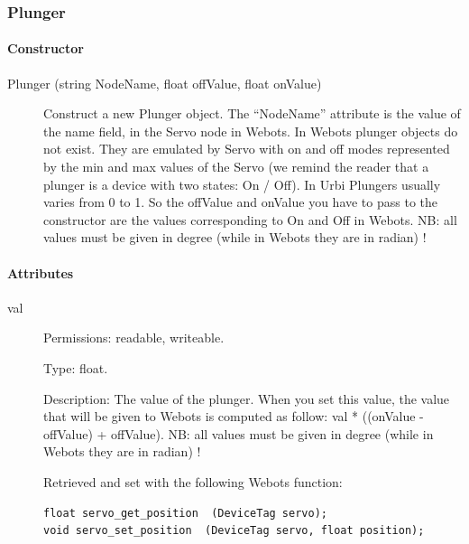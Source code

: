 \subsubsection{Plunger}
\label{webots.uobjects.robotdevices.plunger}%

\paragraph{Constructor}
\label{webots.uobjects.robotdevices.plunger.constructor}%

\noindent
\begin{description}
\item[{Plunger (string NodeName, float offValue, float onValue)}]
  Construct a new Plunger object. The ``NodeName'' attribute is the
  value of the name field, in the Servo node in Webots. In Webots
  plunger objects do not exist. They are emulated by Servo with on and
  off modes represented by the min and max values of the Servo (we
  remind the reader that a plunger is a device with two states: On /
  Off). In Urbi Plungers usually varies from 0 to 1. So the offValue
  and onValue you have to pass to the constructor are the values
  corresponding to On and Off in Webots. NB: all values must be given
  in degree (while in Webots they are in radian) !

\end{description}

\paragraph{Attributes}
\label{webots.uobjects.robotdevices.plunger.attributes}%

\noindent
\begin{description}
\item[{         val
 }]            Permissions: readable, writeable.


 Type: float.


 Description: The value of the plunger. When you set this value, the
 value that will be given to Webots is computed as follow: val *
 ((onValue -{} offValue) + offValue).  NB: all values must be given in
 degree (while in Webots they are in radian) !


          Retrieved and set with the following Webots function:


\begin{lstlisting}
float servo_get_position  (DeviceTag servo);
void servo_set_position  (DeviceTag servo, float position);
\end{lstlisting}
\end{description}

